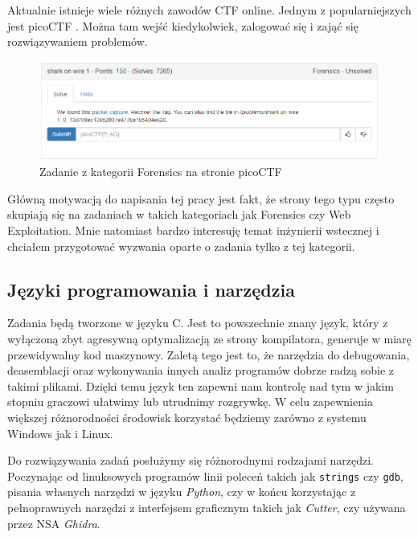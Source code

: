 \documentclass[polish,12pt]{aghthesis}
\begin{document}
Aktualnie istnieje wiele różnych zawodów CTF online.
Jednym z popularniejszych jest \newline picoCTF \cite{picoCTF}.
Można tam wejść kiedykolwiek, zalogować się i zająć się rozwiązywaniem problemów.

\begin{figure}[ht]
    \centering
    \includegraphics[width=15cm]{picoctf}
    \caption{Zadanie z kategorii Forensics na stronie picoCTF}
    \label{fig:picoctf}
\end{figure}

Główną motywacją do napisania tej pracy jest fakt, że strony tego typu często skupiają
się na zadaniach w takich kategoriach jak Forensics czy Web Exploitation.
Mnie natomiast bardzo interesuję temat inżynierii wstecznej i chciałem
przygotować wyzwania oparte o zadania tylko z tej kategorii.

\subsection{Języki programowania i narzędzia}

Zadania będą tworzone w języku C. Jest to powszechnie znany język, który
z wyłączoną zbyt agresywną optymalizacją ze strony kompilatora, generuje
w miarę przewidywalny kod maszynowy. Zaletą tego jest to, że narzędzia
do debugowania, deasemblacji oraz wykonywania innych analiz programów
dobrze radzą sobie z takimi plikami. Dzięki temu język ten
zapewni nam kontrolę nad tym w jakim stopniu graczowi ułatwimy
lub utrudnimy rozgrywkę. W celu zapewnienia większej różnorodności
środowisk korzystać będziemy zarówno z systemu Windows jak i Linux.

Do rozwiązywania zadań posłużymy się różnorodnymi rodzajami narzędzi.
Poczynając od linuksowych programów linii poleceń takich jak \texttt{strings}
czy \texttt{gdb}, pisania własnych narzędzi w języku \emph{Python},
czy w końcu korzystając z pełnoprawnych narzędzi z interfejsem graficznym takich
jak \emph{Cutter}, czy używana przez NSA \emph{Ghidra}.

\clearpage
\end{document}
